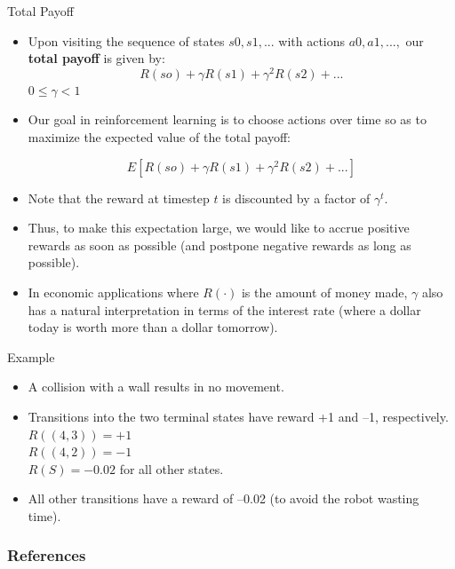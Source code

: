 \documentclass[handout]{beamer}
\begin{document}
\begin{frame}{Total Payoff}
\scriptsize{
\begin{itemize}
\item Upon visiting the sequence of states $s0 , s1 , ...$ with actions $a0, a1, ...,$ our
\textbf{total payoff} is given by:
\begin{displaymath}
 R(so)+\gamma R(s1)+\gamma^2R(s2)+...
\end{displaymath}
$0 \leq \gamma < 1$

\item Our goal in reinforcement learning is to choose actions over time so as to
maximize the expected value of the total payoff:

\begin{displaymath}
 E[R(so)+\gamma R(s1)+\gamma^2R(s2)+...]
\end{displaymath}

\item Note that the reward at timestep $t$ is discounted by a factor of $\gamma^t$.
\item Thus, to make this expectation large, we would like to accrue positive rewards as soon
as possible (and postpone negative rewards as long as possible). 
\item In economic applications where $R(\cdot)$ is the amount of money made, $\gamma$ also has a natural interpretation in terms of the interest rate (where a dollar today is worth
more than a dollar tomorrow).


\end{itemize}


} 

\end{frame}


\begin{frame}{Example}
\scriptsize{
\begin{itemize}
\item A collision with a wall results in no movement.

\item Transitions into the two terminal states have reward +1 and –1, respectively. \\
$R((4,3)) = +1$ \\
$R((4,2)) = -1$ \\
$R(S) = -0.02$ for all other states.

\item All other transitions have a reward of –0.02 (to avoid the robot wasting time).

\end{itemize}


} 

\end{frame}

\begin{frame}[allowframebreaks]\scriptsize
\frametitle{References}


%
\end{frame}  









\end{document}
